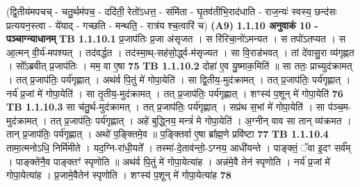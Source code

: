 \documentclass[17pt]{extarticle}
\begin{document}
                  \newline
                                    (द्वि॒तीय॑मपचच् - चतु॒र्थम॑पच॒ - ददि॑ती॒ रेतो॑ऽधत्त॒ - संमि॑ता - 
घृ॒तव॑तीभि॒राद॑धाति - राज॒न्यः॑ स्वस्य॒ छन्द॑सः प्रत्ययन॒स्त्वा - ये॑याद् - गच्छति - मन्थति॒ - रात्र॑य श्च॒त्वारि॑ च) \textbf{(A9)} \newline \newline
                \textbf{ 1.1.10    अनुवाकं   10 - पञ्चाग्न्याधानम्} \newline
                                \textbf{ TB 1.1.10.1} \newline
                  प्र॒जाप॑तिः प्र॒जा अ॑सृजत । स रि॑रिचा॒नो॑ऽमन्यत । स तपो॑ऽतप्यत । स आ॒त्मन् वी॒र्य॑-मपश्यत् । तद॑वर्द्धत । तद॑स्मा॒थ्-सह॑सो॒र्द्ध्व-म॑सृज्यत । सा वि॒राड॑भवत् । तां दे॑वासु॒रा व्य॑गृह्णत । सो᳚ऽब्रवीत् प्र॒जाप॑तिः । मम॒ वा ए॒षा \textbf{ 75} \newline
                  \newline
                                \textbf{ TB 1.1.10.2} \newline
                  दोहा॑ ए॒व यु॒ष्माक॒मिति॑ ॥ सा ततः॒ प्राच्युद॑क्रामत् । तत् प्र॒जाप॑तिः॒ पर्य॑गृह्णात् । अथ॑र्व पि॒तुं मे॑ गोपा॒येति॑ । सा द्वि॒तीय॒-मुद॑क्रामत् । तत् प्र॒जाप॑तिः॒ पर्य॑गृह्णात् । नर्य॑ प्र॒जां मे॑ गोपा॒येति॑ । सा तृ॒तीय॒-मुद॑क्रामत् । तत् प्र॒जाप॑तिः॒ पर्य॑गृह्णात् । शꣳस्य॑ प॒शून् मे॑ गोपा॒येति॑ \textbf{ 76} \newline
                  \newline
                                \textbf{ TB 1.1.10.3} \newline
                  सा च॑तु॒र्थ-मुद॑क्रामत् । तत् प्र॒जाप॑तिः॒ पर्य॑गृह्णात् । सप्र॑थ स॒भां मे॑ गोपा॒येति॑ । सा प॑ञ्च॒म-मुद॑क्रामत् । तत् प्र॒जाप॑तिः॒ पर्य॑गृह्णात् । अहे॑ बुद्ध्निय॒ मन्त्रं॑ मे गोपा॒येति॑ । अ॒ग्नीन् वाव सा तान् व्य॑क्रमत । तान् प्र॒जाप॑तिः॒ पर्य॑गृह्णात् । अथो॑ प॒ङ्क्तिमे॒व ॥ प॒ङ्क्तिर्वा ए॒षा ब्रा᳚ह्म॒णे प्रवि॑ष्टा \textbf{ 77} \newline
                  \newline
                                \textbf{ TB 1.1.10.4} \newline
                  तामा॒त्मनोऽधि॒ निर्मि॑मीते । यद॒ग्नि-रा॑धी॒यते᳚ । तस्मा॑-दे॒ताव॑न्तो॒-ऽग्नय॒ आधी॑यन्ते । पाङ्क्तं॒ ॅवा इ॒दꣳ सर्व᳚म् । पाङ्क्ते॑नै॒व पाङ्क्तꣳ॑ स्पृणोति ॥ अथ॑र्व पि॒तुं मे॑ गोपा॒येत्या॑ह । अन्न॑मे॒वै तेन॑ स्पृणोति । नर्य॑ प्र॒जां मे॑ गोपा॒येत्या॑ह । प्र॒जामे॒वैतेन॑ स्पृणोति । शꣳस्य॑ प॒शून् मे॑ गोपा॒येत्या॑ह \textbf{ 78} \newline
                  \newline
\end{document}
